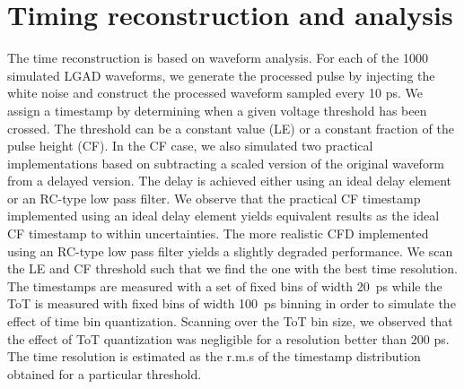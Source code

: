 \documentclass[preprint,1p]{elsarticle}
\begin{document}
\section{Timing reconstruction and analysis}\label{sec:timing_and_analysis}
The time reconstruction is based on waveform analysis. For each of the 1000 simulated LGAD waveforms, 
we generate the processed pulse by injecting the white noise and construct the processed waveform 
sampled every 10 ps. We assign a timestamp by determining when a given voltage threshold has been crossed. 
The threshold can be a constant value (LE) or a constant fraction of the pulse height (CF).
In the CF case, we also simulated two practical implementations based on subtracting
a scaled version of the original waveform from a delayed version. The delay is achieved either using an ideal 
delay element or an RC-type low pass filter. We observe that the practical CF timestamp implemented 
using an ideal delay element yields equivalent results as the ideal CF timestamp to within uncertainties. 
The more realistic CFD implemented using an RC-type low pass filter yields a slightly degraded performance.
We scan the LE and CF threshold such that we find the one with the best time resolution.
The timestamps are measured with a set of fixed bins of width 20~\si{ps} while the ToT is measured with fixed bins of width 100~\si{ps} binning in order to simulate the effect of time bin quantization. Scanning over the ToT bin size, we observed that the effect of ToT quantization was negligible for a resolution better than 200 ps.
The time resolution is estimated as the r.m.s of the timestamp distribution obtained for a particular threshold. 
\end{document}
